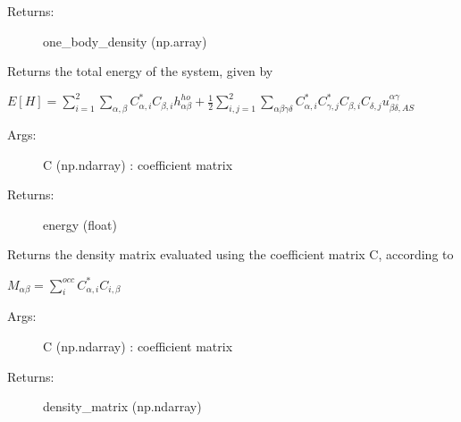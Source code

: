 \documentclass[letterpaper,10pt,english]{sphinxmanual}
\begin{document}
\begin{fulllineitems}
\begin{fulllineitems}
\begin{description}
\item[{Returns:}] \leavevmode
one\_body\_density (np.array)

\end{description}

\end{fulllineitems}


\begin{fulllineitems}
\label{\detokenize{index:do.GHF.evaluate_total_energy}}
Returns the total energy of the system, given by

\(E[H] = \sum_{i=1}^2 \sum_{\alpha,\beta} C_{\alpha,i}^* C_{\beta,i} h_{\alpha\beta}^{ho} + \frac{1}{2} \sum_{i,j=1}^2 \sum_{\alpha\beta\gamma\delta} C_{\alpha,i}^* C_{\gamma,j}^* C_{\beta,i} C_{\delta,j}  u^{\alpha\gamma}_{\beta\delta,AS}\)
\begin{description}
\item[{Args:}] \leavevmode
C (np.ndarray) : coefficient matrix

\item[{Returns:}] \leavevmode
energy (float)

\end{description}

\end{fulllineitems}


\begin{fulllineitems}
\label{\detokenize{index:do.GHF.fill_density_matrix}}
Returns the density matrix evaluated using the coefficient matrix C, according to

\(M_{\alpha\beta} = \sum_i^{occ} C_{\alpha,i}^* C_{i,\beta}\)
\begin{description}
\item[{Args:}] \leavevmode
C (np.ndarray) : coefficient matrix

\item[{Returns:}] \leavevmode
density\_matrix (np.ndarray)

\end{description}

\end{fulllineitems}


\end{fulllineitems}
\end{document}
